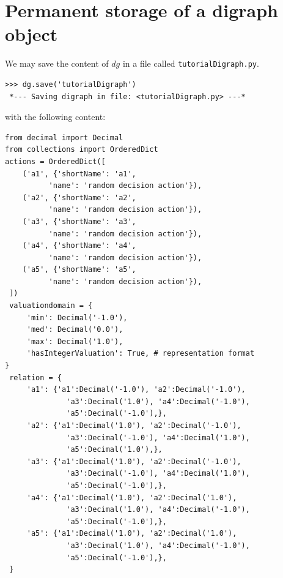 \section{Permanent storage of a digraph object}
\label{sec:1.3}                   
We may save the content of $dg$ in a file called \texttt{tutorialDigraph.py}.
\begin{lstlisting}
>>> dg.save('tutorialDigraph')
 *--- Saving digraph in file: <tutorialDigraph.py> ---*
\end{lstlisting}
with the following content:
\begin{lstlisting}[caption={A stored digraph instance},label=list:1.2]
from decimal import Decimal
from collections import OrderedDict
actions = OrderedDict([
    ('a1', {'shortName': 'a1',
          'name': 'random decision action'}),
    ('a2', {'shortName': 'a2',
          'name': 'random decision action'}),
    ('a3', {'shortName': 'a3',
          'name': 'random decision action'}),
    ('a4', {'shortName': 'a4',
          'name': 'random decision action'}),
    ('a5', {'shortName': 'a5',
          'name': 'random decision action'}),
 ])
 valuationdomain = {
     'min': Decimal('-1.0'),
     'med': Decimal('0.0'),
     'max': Decimal('1.0'),
     'hasIntegerValuation': True, # representation format
}
 relation = {
     'a1': {'a1':Decimal('-1.0'), 'a2':Decimal('-1.0'),
              'a3':Decimal('1.0'), 'a4':Decimal('-1.0'),
              'a5':Decimal('-1.0'),},
     'a2': {'a1':Decimal('1.0'), 'a2':Decimal('-1.0'),
              'a3':Decimal('-1.0'), 'a4':Decimal('1.0'),
              'a5':Decimal('1.0'),},
     'a3': {'a1':Decimal('1.0'), 'a2':Decimal('-1.0'),
              'a3':Decimal('-1.0'), 'a4':Decimal('1.0'),
              'a5':Decimal('-1.0'),},
     'a4': {'a1':Decimal('1.0'), 'a2':Decimal('1.0'),
              'a3':Decimal('1.0'), 'a4':Decimal('-1.0'),
              'a5':Decimal('-1.0'),},
     'a5': {'a1':Decimal('1.0'), 'a2':Decimal('1.0'),
              'a3':Decimal('1.0'), 'a4':Decimal('-1.0'),
              'a5':Decimal('-1.0'),},
 }
\end{lstlisting}


